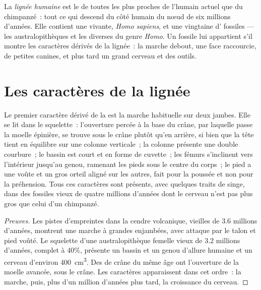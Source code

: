 \begin{definition}\label{def:g12:human-evolution:lineage}
La \emph{lignée humaine} est le  de toutes
les  plus proches de l'humain actuel que du chimpanzé~: tout ce
qui descend du côté humain du nœud de six millions d'années. Elle
contient une  vivante, \emph{Homo sapiens}, et une vingtaine
d' fossiles --- les australopithèques et les diverses 
du genre \emph{Homo}. Un fossile lui appartient s'il montre les
caractères dérivés de la lignée~: la marche debout, une face
raccourcie, de petites canines, et plus tard un grand cerveau et des
outils.
\end{definition}

\section{Les caractères de la lignée}

\begin{proposition}\label{prop:g12:human-evolution:bipedalism}
Le premier caractère dérivé de la  est la marche
habituelle sur deux jambes. Elle se lit dans le squelette~: l'ouverture
percée à la base du crâne, par laquelle passe la moelle épinière, se
trouve sous le crâne plutôt qu'en arrière, si bien que la tête tient
en équilibre sur une colonne verticale~; la colonne présente une
double courbure~; le bassin est court et en forme de cuvette~; les
fémurs s'inclinent vers l'intérieur jusqu'au genou, ramenant les pieds
sous le centre du corps~; le pied a une voûte et un gros orteil aligné
sur les autres, fait pour la poussée et non pour la préhension. Tous
ces caractères sont présents, avec quelques traits de singe, dans des
fossiles vieux de quatre millions d'années dont le cerveau n'est pas
plus gros que celui d'un chimpanzé.
\end{proposition}
\begin{proof}[Preuves]
Les pistes d'empreintes dans la cendre volcanique, vieilles de 3.6
millions d'années, montrent une marche à grandes enjambées, avec
attaque par le talon et pied voûté. Le squelette d'une australopithèque
femelle vieux de 3.2 millions d'années, complet à 40\%, présente un
bassin et un genou d'allure humaine et un cerveau d'environ
\qty{400}{cm^3}. Des  de crâne du même âge ont l'ouverture de la
moelle avancée, sous le crâne. Les caractères apparaissent dans cet
ordre~: la marche, puis, plus d'un million d'années plus tard, la
croissance du cerveau.
\end{proof}

